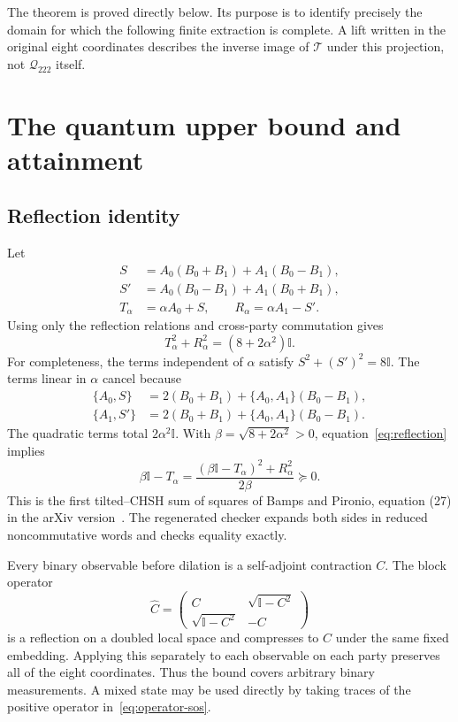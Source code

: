 \documentclass[11pt]{article}
\newcommand{\Q}{{\mathcal Q_{222}}}
\newcommand{\T}{\mathcal T}
\newcommand{\Id}{\mathbb I}
\begin{document}
The theorem is proved directly below. Its purpose is to identify precisely the domain for which the following finite extraction is complete. A lift written in the original eight coordinates describes the inverse image of $\T$ under this projection, not $\Q$ itself.

\section{The quantum upper bound and attainment}
\subsection{Reflection identity}
Let
\begin{align*}
 S&=A_0(B_0+B_1)+A_1(B_0-B_1),\\
 S'&=A_0(B_0-B_1)+A_1(B_0+B_1),\\
 T_\alpha&=\alpha A_0+S,\qquad R_\alpha=\alpha A_1-S'.
\end{align*}
Using only the reflection relations and cross-party commutation gives
\begin{equation}\label{eq:reflection}
 T_\alpha^2+R_\alpha^2=(8+2\alpha^2)\Id.
\end{equation}
For completeness, the terms independent of $\alpha$ satisfy $S^2+(S')^2=8\Id$. The terms linear in $\alpha$ cancel because
\begin{align*}
 \{A_0,S\}&=2(B_0+B_1)+\{A_0,A_1\}(B_0-B_1),\\
 \{A_1,S'\}&=2(B_0+B_1)+\{A_0,A_1\}(B_0-B_1).
\end{align*}
The quadratic terms total $2\alpha^2\Id$.
With $\beta=\sqrt{8+2\alpha^2}>0$, equation~\eqref{eq:reflection} implies
\begin{equation}\label{eq:operator-sos}
 \beta\Id-T_\alpha
 =\frac{(\beta\Id-T_\alpha)^2+R_\alpha^2}{2\beta}\succeq0.
\end{equation}
This is the first tilted--CHSH sum of squares of Bamps and Pironio, equation (27) in the arXiv version~\cite{BP}. The regenerated checker expands both sides in reduced noncommutative words and checks equality exactly.

Every binary observable before dilation is a self-adjoint contraction $C$. The block operator
\[
 \widehat C=\begin{pmatrix}C&\sqrt{\Id-C^2}\\
 \sqrt{\Id-C^2}&-C\end{pmatrix}
\]
is a reflection on a doubled local space and compresses to $C$ under the same fixed embedding. Applying this separately to each observable on each party preserves all of the eight coordinates. Thus the bound covers arbitrary binary measurements. A mixed state may be used directly by taking traces of the positive operator in~\eqref{eq:operator-sos}.
\end{document}
